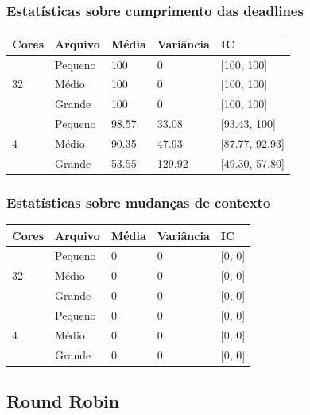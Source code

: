 \documentclass{beamer}
\begin{document}
\begin{frame}
\frametitle{Estatísticas sobre cumprimento das deadlines}
\begin{table}
\begin{tabular}{l l l l l}
\toprule
\textbf{Cores} & \textbf{Arquivo} & \textbf{Média} & \textbf{Variância} & \textbf{IC}\\
\midrule
\multirow{3}{*}{32} & Pequeno & 100   & 0      & [100, 100] \\
					& Médio   & 100   & 0      & [100, 100] \\
					& Grande  & 100   & 0      & [100, 100] \\
\midrule
\multirow{3}{*}{4}  & Pequeno & 98.57 & 33.08  & [93.43, 100] \\
					& Médio   & 90.35 & 47.93  & [87.77, 92.93] \\
					& Grande  & 53.55 & 129.92 & [49.30, 57.80] \\
\bottomrule
\end{tabular}
\end{table}
\end{frame}

\begin{frame}
\frametitle{Estatísticas sobre mudanças de contexto}
\begin{table}
\begin{tabular}{l l l l l}
\toprule
\textbf{Cores} & \textbf{Arquivo} & \textbf{Média} & \textbf{Variância} & \textbf{IC}\\
\midrule
\multirow{3}{*}{32} & Pequeno & 0 & 0 & [0, 0] \\
					& Médio   & 0 & 0 & [0, 0] \\
					& Grande  & 0 & 0 & [0, 0] \\
\midrule
\multirow{3}{*}{4}  & Pequeno & 0 & 0 & [0, 0] \\
					& Médio   & 0 & 0 & [0, 0] \\
					& Grande  & 0 & 0 & [0, 0] \\
\bottomrule
\end{tabular}
\end{table}
\end{frame}

\subsection{Round Robin}
\end{document}
